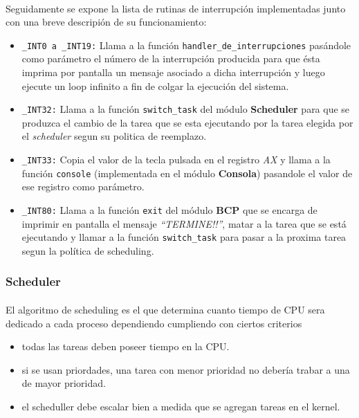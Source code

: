 \documentclass[11pt, a4paper]{article}
\begin{document}
	\paragraph{}
	Seguidamente se expone la lista de rutinas de interrupción implementadas junto con una breve descripión de su funcionamiento:
	\begin{itemize}
		\item \texttt{\_INT0 a \_INT19:} Llama a la función \texttt{handler\_de\_interrupciones} pasándole como parámetro el número de la interrupción producida para que ésta imprima por pantalla un mensaje asociado a dicha interrupción y luego ejecute un loop infinito a fin de colgar la ejecución del sistema.
		\item \texttt{\_INT32:} Llama a la función \texttt{switch\_task} del módulo \textbf{Scheduler} para que se produzca el cambio de la tarea que se esta ejecutando por la tarea elegida por el \textit{scheduler} segun su politica de reemplazo.
		\item \texttt{\_INT33:} Copia el valor de la tecla pulsada en el registro \textit{AX} y llama a la función \texttt{console} (implementada en el módulo \textbf{Consola}) pasandole el valor de ese registro como parámetro.
		\item \texttt{\_INT80:} Llama a la función \texttt{exit} del módulo \textbf{BCP} que se encarga de imprimir en pantalla el mensaje \textit{``TERMINE!!''}, matar a la tarea que se está ejecutando y llamar a la función \texttt{switch\_task} para pasar a la proxima tarea segun la política de scheduling. 
	\end{itemize}

\subsubsection{Scheduler}
	\paragraph{}
	El algoritmo de scheduling es el que determina cuanto tiempo de CPU sera dedicado a cada proceso dependiendo cumpliendo con ciertos criterios
	\begin{itemize}
		\item todas las tareas deben poseer tiempo en la CPU.
		\item si se usan priordades, una tarea con menor prioridad no debería trabar a una de mayor prioridad.
		\item el scheduller debe escalar bien a medida que se agregan tareas en el kernel.
	\end{itemize}
\end{document}
